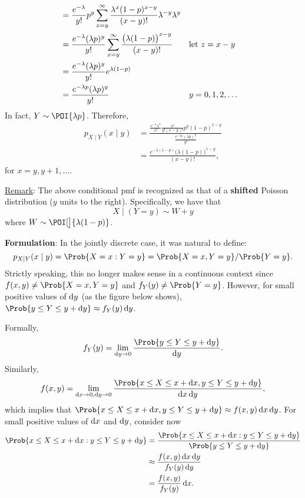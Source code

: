 \begin{Example}
\begin{align*}
         & =\frac{e^{-\lambda}}{y!} p^y \sum_{x=y}^\infty \frac{\lambda^x (1-p)^{x-y}}{(x-y)!}\lambda^{-y}\lambda^{y}                           \\
         & =\frac{e^{-\lambda}(\lambda p)^y}{y!}\sum_{x=y}^\infty \frac{\bigl(\lambda(1-p)\bigr)^{x-y}}{(x-y)!}       &  & \text{let $ z=x-y $} \\
         & =\frac{e^{-\lambda}(\lambda p)^y}{y!}e^{\lambda(1-p)}                                                                                \\
         & =\frac{e^{-\lambda p}(\lambda p)^y}{y!}                                                                    &  & y=0,1,2,\ldots
    \end{align*}
    In fact, $ Y \sim \POI{\lambda p} $. Therefore,
    \begin{align*}
        p_{X\mid Y}(x\mid y)
         & =\frac{ \frac{e^{-\lambda}\lambda^x}{x!} \frac{x!}{y!(x-y)!} p^y(1-p)^{x-y} }{\frac{e^{-\lambda p}(\lambda p)^y}{y!}} \\
         & =\frac{e^{-\lambda(1-p)}\bigl(\lambda(1-p)\bigr)^{x-y}}{(x-y)!},
    \end{align*}
    for $ x=y,y+1,\ldots $.
\end{Example}
\underline{Remark}: The above conditional pmf is recognized as that of a \textbf{shifted} Poisson distribution ($ y $ units to the right).
Specifically, we have that
\[ X\mid(Y=y)\sim W+y \]
where $ W \sim \POI[\big]{\lambda(1-p)} $.
\begin{Regular}
    \textbf{Formulation}: In the jointly discrete case, it was natural to define:
    \[ p_{X\mid Y}(x\mid y)=\Prob{X=x\given Y=y}=\Prob{X=x,Y=y}/\Prob{Y=y}. \]
    Strictly speaking, this no longer makes sense in a continuous context since $ f(x,y)\ne \Prob{X=x,Y=y} $ and
    $ f_Y(y)\ne \Prob{Y=y} $. However, for small positive values of $ \odif{y} $ (as the figure below shows),
    $ \Prob{y\le Y\le y+\odif{y}}\approx f_Y(y)\odif{y} $.
\end{Regular}
Formally,
\[ f_Y(y)=\lim\limits_{{\odif{y}} \to {0}}\frac{\Prob{y\le Y\le y+\odif{y}}}{\odif{y}}. \]
Similarly,
\[ f(x,y)=\lim\limits_{\odif{x}\to 0,\odif{y}\to 0}\frac{\Prob{x\le X\le x+\odif{x},y\le Y\le y+\odif{y}}}{\odif{x,y}},   \]
which implies that $ \Prob{x\le X\le x+\odif{x},y\le Y\le y+\odif{y}}\approx f(x,y)\odif{x,y} $. For small positive values of
$ \odif{x} $ and $ \odif{y} $, consider now
\begin{align*}
    \Prob{x\le X\le x+\odif{x}\given y\le Y\le y+\odif{y}}
     & =\frac{\Prob{x\le X\le x+\odif{x}\given y\le Y\le y+\odif{y}}}{\Prob{y\le Y\le y+\odif{y}}} \\
     & \approx \frac{f(x,y)\odif{x,y}}{f_Y(y)\odif{y}}                                             \\
     & =\frac{f(x,y)}{f_Y(y)} \odif{x}.
\end{align*}
